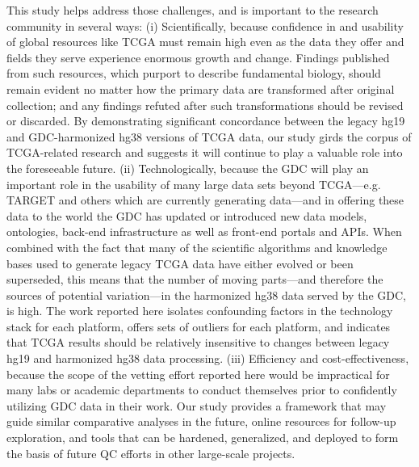 This study helps address those challenges, and is important to the research community in several ways: (i) Scientifically, because confidence in and usability of global resources like TCGA must remain high even as the data they offer and fields they serve experience enormous growth and change. Findings published from such resources, which purport to describe fundamental biology, should remain evident no matter how the primary data are transformed after original collection; and any findings refuted after such transformations should be revised or discarded. By demonstrating significant concordance between the legacy hg19 and GDC-harmonized hg38 versions of TCGA data, our study girds the corpus of TCGA-related research and suggests it will continue to play a valuable role into the foreseeable future. (ii) Technologically, because the GDC will play an important role in the usability of many large data sets beyond TCGA---e.g. TARGET and others which are currently generating data---and in offering these data to the world the GDC has updated or introduced new data models, ontologies, back-end infrastructure as well as front-end portals and APIs. When combined with the fact that many of the scientific algorithms and knowledge bases used to generate legacy TCGA data have either evolved or been superseded, this means that the number of moving parts—and therefore the sources of potential variation—in the harmonized hg38 data served by the GDC, is high. The work reported here isolates confounding factors in the technology stack for each platform, offers sets of outliers for each platform, and indicates that TCGA results should be relatively insensitive to changes between legacy hg19 and harmonized hg38 data processing. (iii) Efficiency and cost-effectiveness, because the scope of the vetting effort reported here would be impractical for many labs or academic departments to conduct themselves prior to confidently utilizing GDC data in their work. Our study provides a framework that may guide similar comparative analyses in the future, online resources for follow-up exploration, and tools that can be hardened, generalized, and deployed to form the basis of future QC efforts in other large-scale projects.
